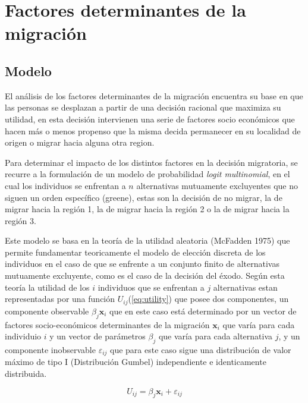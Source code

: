 \documentclass[12pt,a4paper]{article}
\begin{document}
\section{Factores determinantes de la migración}
\subsection{Modelo}
El análisis de los factores determinantes de la migración  encuentra su base en que las personas se desplazan a partir de una decisión racional que maximiza su utilidad, en esta decisión intervienen una serie de factores socio económicos que hacen más o menos propenso que la misma decida permanecer en su localidad de origen o migrar hacia alguna otra region.

Para determinar el impacto de los distintos factores en la decisión migratoria, se recurre a la formulación de un modelo de probabilidad \textit{logit multinomial}, en el cual los individuos se enfrentan a $n$ alternativas mutuamente excluyentes que no siguen un orden específico (greene), estas son la decisión de no migrar, la de migrar hacia la región 1, la de migrar hacia la región 2 o la de migrar hacia la región 3.

Este modelo se basa en la teoría de la utilidad aleatoria (McFadden 1975) que permite fundamentar teoricamente el modelo de elección discreta de los individuos en el caso de que se enfrente a un conjunto finito de alternativas mutuamente excluyente, como es el caso de la decisión del éxodo.
Según esta teoría la utilidad de los $i$ individuos que se enfrentan a $j$ alternativas estan representadas por una función $U_{ij}$(\ref{eq:utility}) que posee dos componentes, un componente observable $\beta_{j} \textbf{x}_{i}$  que en este caso está determinado por un vector de factores socio-económicos determinantes de la migración $\textbf{x}_{i}$ que varía para cada individuio $i$ y un vector de parámetros $\beta_{j}$ que varía para cada alternativa $j$, y un componente inobservable $\varepsilon_{ij}$ que para este caso sigue una distribución de valor máximo de tipo I (Distribución Gumbel) independiente e identicamente distribuida.
\begin {center}
\begin{equation}\label{eq:utility}
U_{ij}=\beta_{j} \textbf{x}_{i}+\varepsilon_{ij}
\end{equation}
\end {center}
\end{document}
